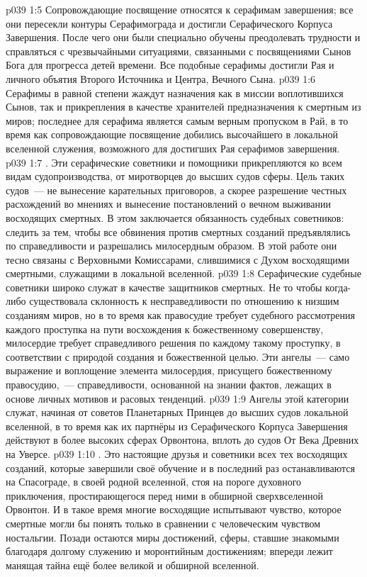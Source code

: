 \vs p039 1:5 Сопровождающие посвящение относятся к серафимам завершения; все они пересекли контуры Серафимограда и достигли Серафического Корпуса Завершения. После чего они были специально обучены преодолевать трудности и справляться с чрезвычайными ситуациями, связанными с посвящениями Сынов Бога для прогресса детей времени. Все подобные серафимы достигли Рая и личного объятия Второго Источника и Центра, Вечного Сына.
\vs p039 1:6 Серафимы в равной степени жаждут назначения как в миссии воплотившихся Сынов, так и прикрепления в качестве хранителей предназначения к смертным из миров; последнее для серафима является самым верным пропуском в Рай, в то время как сопровождающие посвящение добились высочайшего в локальной вселенной служения, возможного для достигших Рая серафимов завершения.
\vs p039 1:7 . Эти серафические советники и помощники прикрепляются ко всем видам судопроизводства, от миротворцев до высших судов сферы. Цель таких судов~--- не вынесение карательных приговоров, а скорее разрешение честных расхождений во мнениях и вынесение постановлений о вечном выживании восходящих смертных. В этом заключается обязанность судебных советников: следить за тем, чтобы все обвинения против смертных созданий предъявлялись по справедливости и разрешались милосердным образом. В этой работе они тесно связаны с Верховными Комиссарами, слившимися с Духом восходящими смертными, служащими в локальной вселенной.
\vs p039 1:8 Серафические судебные советники широко служат в качестве защитников смертных. Не то чтобы когда\hyp{}либо существовала склонность к несправедливости по отношению к низшим созданиям миров, но в то время как правосудие требует судебного рассмотрения каждого проступка на пути восхождения к божественному совершенству, милосердие требует справедливого решения по каждому такому проступку, в соответствии с природой создания и божественной целью. Эти ангелы~--- само выражение и воплощение элемента милосердия, присущего божественному правосудию,~--- справедливости, основанной на знании фактов, лежащих в основе личных мотивов и расовых тенденций.
\vs p039 1:9 Ангелы этой категории служат, начиная от советов Планетарных Принцев до высших судов локальной вселенной, в то время как их партнёры из Серафического Корпуса Завершения действуют в более высоких сферах Орвонтона, вплоть до судов От Века Древних на Уверсе.
\vs p039 1:10 . Это настоящие друзья и советники всех тех восходящих созданий, которые завершили своё обучение и в последний раз останавливаются на Спасограде, в своей родной вселенной, стоя на пороге духовного приключения, простирающегося перед ними в обширной сверхвселенной Орвонтон. И в такое время многие восходящие испытывают чувство, которое смертные могли бы понять только в сравнении с человеческим чувством ностальгии. Позади остаются миры достижений, сферы, ставшие знакомыми благодаря долгому служению и моронтийным достижениям; впереди лежит манящая тайна ещё более великой и обширной вселенной.
